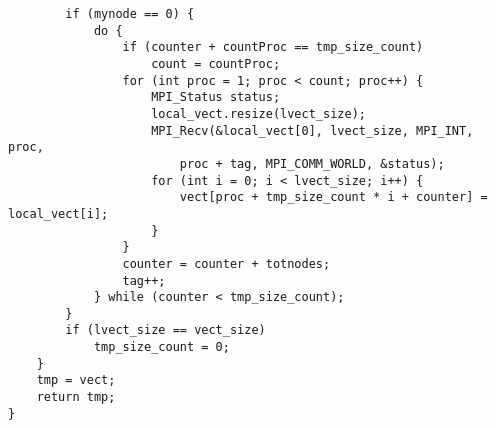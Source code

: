 \documentclass{report}
\begin{document}
\begin{verbatim}
        if (mynode == 0) {
            do {
                if (counter + countProc == tmp_size_count)
                    count = countProc;
                for (int proc = 1; proc < count; proc++) {
                    MPI_Status status;
                    local_vect.resize(lvect_size);
                    MPI_Recv(&local_vect[0], lvect_size, MPI_INT, proc,
                        proc + tag, MPI_COMM_WORLD, &status);
                    for (int i = 0; i < lvect_size; i++) {
                        vect[proc + tmp_size_count * i + counter] = local_vect[i];
                    }
                }
                counter = counter + totnodes;
                tag++;
            } while (counter < tmp_size_count);
        }
        if (lvect_size == vect_size)
            tmp_size_count = 0;        
    }
    tmp = vect;
    return tmp;
}
 	\end{verbatim}
\end{document}

